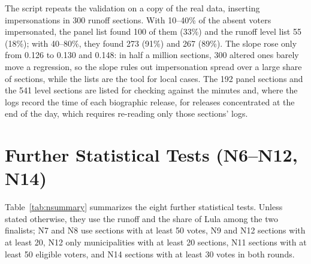 The script repeats the validation on a copy of the real data, inserting
impersonations in 300 runoff sections. With 10--40\% of the absent voters
impersonated, the panel list found 100 of them (33\%) and the runoff level
list 55 (18\%); with 40--80\%, they found 273 (91\%) and 267 (89\%). The
slope rose only from 0.126 to 0.130 and 0.148: in half a million sections,
300 altered ones barely move a regression, so the slope rules out
impersonation spread over a large share of sections, while the lists are
the tool for local cases. The 192 panel sections and the 541 level
sections are listed for checking against the minutes and, where the logs
record the time of each biographic release, for releases concentrated at the
end of the day, which requires re-reading only those sections' logs.

\section{Further Statistical Tests (N6--N12, N14)}
\label{sec:extended}

Table~\ref{tab:nsummary} summarizes the eight further statistical tests.
Unless stated otherwise, they use the runoff and the share of Lula among the
two finalists; N7 and N8 use sections with at least 50 votes, N9 and N12
sections with at least 20, N12 only municipalities with at least 20
sections, N11 sections with at least 50 eligible voters, and N14 sections
with at least 30 votes in both rounds.

